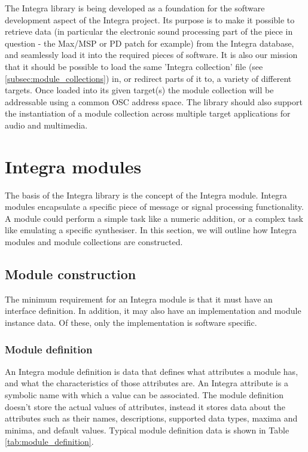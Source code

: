 \documentclass{article}
\begin{document}
The Integra library is being developed as a foundation for the software development aspect of the Integra project. Its purpose is to make it possible to retrieve data (in particular the electronic sound processing part of the piece in question - the Max/MSP or PD patch for example) from the Integra database, and seamlessly load it into the required pieces of software. It is also our mission that it should be possible to load the same 'Integra collection' file (see \ref{subsec:module_collections}) in, or redirect parts of it to, a variety of different targets. Once loaded into its given target(s) the module collection will be addressable using a common OSC address space. The library should also support the instantiation of a module collection across multiple target applications for audio and multimedia.

\section{Integra modules}\label{sec:modules}

The basis of the Integra library is the concept of the Integra module. Integra modules encapsulate a specific piece of message or signal processing functionality. A module could perform a simple task like a numeric addition, or a complex task like emulating a specific synthesiser. In this section, we will outline how Integra modules and module collections are constructed.

\subsection{Module construction}\label{subsec:module_construction}

The minimum requirement for an Integra module is that it must have an interface definition. In addition, it may also have an implementation and module instance data. Of these, only the implementation is software specific.

\subsubsection{Module definition}\label{subsubsec:module_definition}

An Integra module definition is data that defines what attributes a module has, and what the characteristics of those attributes are. An Integra attribute is a symbolic name with which a value can be associated. The module definition doesn't store the actual values of attributes, instead it stores data about the attributes such as their names, descriptions, supported data types, maxima and minima, and default values. Typical module definition data is shown in Table \ref{tab:module_definition}.
\end{document}
